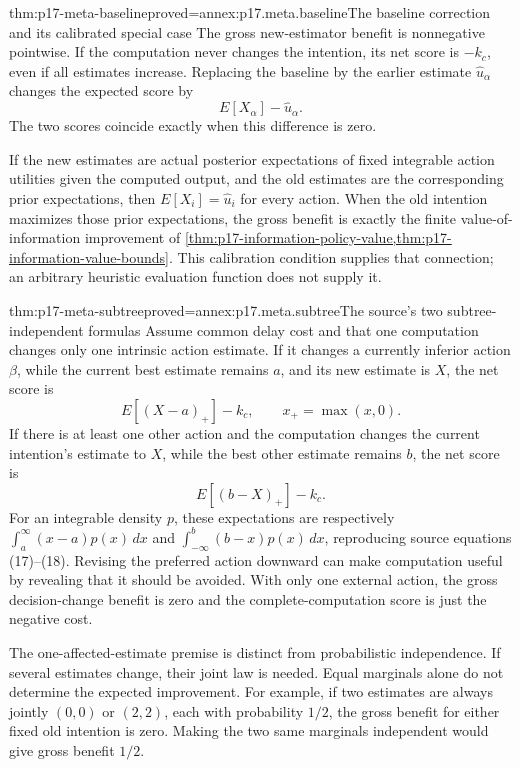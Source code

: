 \begin{hbtheorem}{thm:p17-meta-baseline}{proved=annex:p17.meta.baseline}{The baseline correction and its calibrated special case}
The gross new-estimator benefit is nonnegative pointwise. If the
computation never changes the intention, its net score is \(-k_c\),
even if all estimates increase. Replacing the baseline by the earlier
estimate \(\widehat u_\alpha\) changes the expected score by
\[
                     E[X_\alpha]-\widehat u_\alpha.
\]
The two scores coincide exactly when this difference is zero.

If the new estimates are actual posterior expectations of fixed
integrable action utilities given the computed output, and the old
estimates are the corresponding prior expectations, then
\(E[X_i]=\widehat u_i\) for every action. When the old intention
maximizes those prior expectations, the gross benefit is exactly
the finite value-of-information improvement of
\cref{thm:p17-information-policy-value,thm:p17-information-value-bounds}.
This calibration condition supplies that connection; an arbitrary
heuristic evaluation function does not supply it.
\end{hbtheorem}

\begin{hbtheorem}{thm:p17-meta-subtree}{proved=annex:p17.meta.subtree}{The source's two subtree-independent formulas}
Assume common delay cost and that one computation changes only one
intrinsic action estimate.
If it changes a currently inferior action \(\beta\), while the
current best estimate remains \(a\), and its new estimate is \(X\),
the net score is
\[
                       E[(X-a)_+]-k_c,
                         \qquad x_+=\max(x,0).
\]
If there is at least one other action and the computation changes
the current intention's estimate to \(X\), while the
best other estimate remains \(b\), the net score is
\[
                              E[(b-X)_+]-k_c.
\]
For an integrable density \(p\), these expectations are respectively
\(\int_a^\infty (x-a)p(x)\,dx\) and
\(\int_{-\infty}^b(b-x)p(x)\,dx\), reproducing source
equations (17)--(18). Revising the preferred action downward can make
computation useful by revealing that it should be avoided.
With only one external action, the gross decision-change benefit is
zero and the complete-computation score is just the negative cost.

The one-affected-estimate premise is distinct from probabilistic
independence. If several estimates change, their joint law is needed.
Equal marginals alone do not determine the expected improvement.
For example, if two estimates are always jointly \((0,0)\) or
\((2,2)\), each with probability \(1/2\), the gross benefit for
either fixed old intention is zero. Making the two same marginals
independent would give gross benefit \(1/2\).
\end{hbtheorem}

